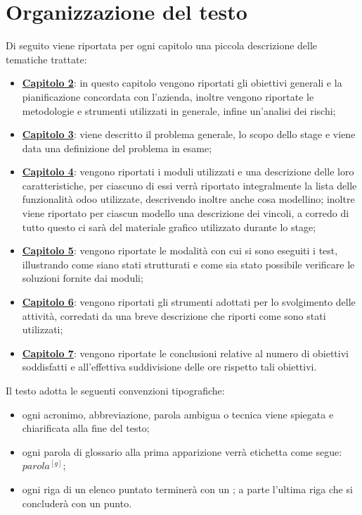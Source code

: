 \section{Organizzazione del testo}
Di seguito viene riportata per ogni capitolo una piccola descrizione delle tematiche trattate:
\begin{itemize}
	\item \hyperlink{(chap:capitolo2)}{\textbf{Capitolo 2}}: in questo capitolo vengono riportati gli obiettivi generali e la pianificazione concordata con l'azienda, inoltre vengono riportate le metodologie e strumenti utilizzati in generale, infine un'analisi dei rischi;
	\item \hyperlink{(chap:capitolo3)}{\textbf{Capitolo 3}}: viene descritto il problema generale, lo scopo dello stage e viene data una definizione del problema in esame;
	\item \hyperlink{(chap:capitolo4)}{\textbf{Capitolo 4}}: vengono riportati i moduli utilizzati e una descrizione delle loro caratteristiche, per ciascuno di essi verrà riportato integralmente la lista delle funzionalità odoo utilizzate, descrivendo inoltre anche cosa modellino; inoltre viene riportato per ciascun modello una descrizione dei vincoli, a corredo di tutto questo ci sarà del materiale grafico utilizzato durante lo stage;
	\item \hyperlink{(chap:capitolo5)}{\textbf{Capitolo 5}}: vengono riportate le modalità con cui si sono eseguiti i test, illustrando come siano stati strutturati e come sia stato possibile verificare le soluzioni fornite dai moduli;
	\item \hyperlink{(chap:capitolo6)}{\textbf{Capitolo 6}}: vengono riportati gli strumenti adottati per lo svolgimento delle attività, corredati da una breve descrizione che riporti come sono stati utilizzati;

	\item \hyperlink{(chap:capitolo8)}{\textbf{Capitolo 7}}: vengono riportate le conclusioni relative al numero di obiettivi soddisfatti e all'effettiva suddivisione delle ore rispetto tali obiettivi.

\end{itemize}
\vspace*{1cm}
Il testo adotta le seguenti convenzioni tipografiche:
\begin{itemize}
	\item ogni acronimo, abbreviazione, parola ambigua o tecnica viene spiegata e chiarificata alla fine del testo;
	\item ogni parola di glossario alla prima apparizione verrà etichetta come segue: $parola^{[g]}$;
	\item ogni riga di un elenco puntato terminerà con un ; a parte l'ultima riga che si concluderà con un punto.
\end{itemize}